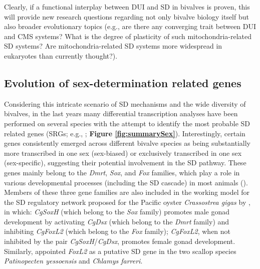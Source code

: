 \documentclass[../main.tex]{subfiles}
\begin{document}
Clearly, if a functional interplay between DUI and SD in bivalves is proven, this will provide new research questions regarding not only bivalve biology itself but also broader evolutionary topics (e.g., are there any converging trait between DUI and CMS systems? What is the degree of plasticity of such mitochondria-related SD systems? Are mitochondria-related SD systems more widespread in eukaryotes than currently thought?).

\subsection{Evolution of sex-determination related genes}
Considering this intricate scenario of SD mechanisms and the wide diversity of bivalves, in the last years many differential transcription analyses have been performed on several species with the attempt to identify the most probable SD related genes (SRGs; e.g., \textbf{\cite{milani2013nuclear,zhang2014genomic,chen2017transcriptome,capt2018deciphering,shi2018proteome}}; \textbf{Figure \ref{fig:summarySex}}). Interestingly, certain genes consistently emerged across different bivalve species as being substantially more transcribed in one sex (sex-biased) or exclusively transcribed in one sex (sex-specific), suggesting their potential involvement in the SD pathway. These genes mainly belong to the \textit{Dmrt}, \textit{Sox}, and \textit{Fox} families, which play a role in various developmental processes (including the SD cascade) in most animals (\textbf{\cite{marshall2010homologies,bachtrog2014sex,beukeboom2014evolution}}). Members of these three gene families are also included in the working model for the SD regulatory network proposed for the Pacific oyster \textit{Crassostrea gigas} by \textbf{\cite{zhang2014genomic}}, in which: \textit{CgSoxH} (which belong to the \textit{Sox} family) promotes male gonad development by activating \textit{CgDsx} (which belong to the \textit{Dmrt} family) and inhibiting \textit{CgFoxL2} (which belong to the \textit{Fox} family); \textit{CgFoxL2}, when not inhibited by the pair \textit{CgSoxH}/\textit{CgDsx}, promotes female gonad development. Similarly, \textbf{\cite{han2022ancient}} appointed \textit{FoxL2} as a putative SD gene in the two scallop species \textit{Patinopecten yessoensis} and \textit{Chlamys farreri}. 
\end{document}
